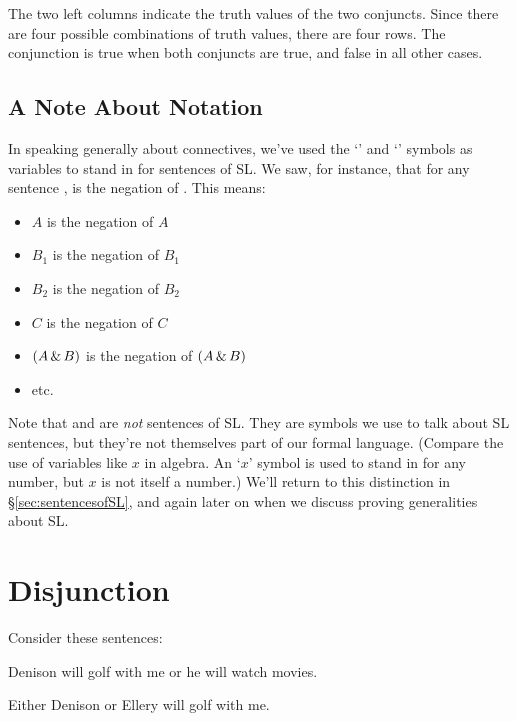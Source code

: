 The two left columns indicate the truth values of the two conjuncts. Since there are four possible combinations of truth values, there are four rows. The conjunction is true when both conjuncts are true, and false in all other cases.


\subsection{A Note About Notation}
\label{notationnote}

In speaking generally about connectives, we've used the `\metaA{}' and `\metaB{}' symbols as variables to stand in for sentences of SL. We saw, for instance, that for any sentence \metaA{}, \enot\metaA{} is the negation of \metaA{}. This means:

\begin{itemize}
\item \enot $A$ is the negation of $A$
\item \enot $B_1$ is the negation of $B_1$
\item \enot $B_2$ is the negation of $B_2$
\item \enot \enot $C$ is the negation of \enot $C$
\item \enot $(A \,\&\, B)$ is the negation of $(A\,\&\, B)$
\item etc.
\end{itemize}

Note that \metaA{} and \metaB{} are \emph{not} sentences of SL. They are symbols we use to talk about SL sentences, but they're not themselves part of our formal language. (Compare the use of variables like $x$ in algebra. An `$x$' symbol is used to stand in for any number, but $x$ is not itself a number.) We'll return to this distinction in \S\ref{sec:sentencesofSL}, and again later on when we discuss proving generalities about SL.


\section{Disjunction}
Consider these sentences:
\begin{earg}
\item[\ex{or1}]Denison will golf with me or he will watch movies.
\item[\ex{or2}]Either Denison or Ellery will golf with me. 
\end{earg}

